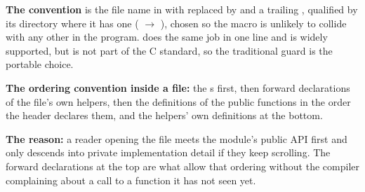 \textbf{The convention} is the file name in  with  replaced by \code{_} and
a trailing \code{_}, qualified by its directory where it has one (
$\rightarrow$ ), chosen so the macro is unlikely to collide with any other in
the program.  does the same job in one line and is widely supported, but is not
part of the C standard, so the traditional guard is the portable choice. 

\textbf{The ordering convention inside a  file:} the s first, then forward
declarations of the file's own  helpers, then the definitions of the public functions
in the order the header declares them, and the  helpers' own definitions at the
bottom.

\textbf{The reason:} a reader opening the file meets the module's public API first and only descends
into private implementation detail if they keep scrolling. The forward declarations at the top are
what allow that ordering without the compiler complaining about a call to a function it has not seen
yet. 


